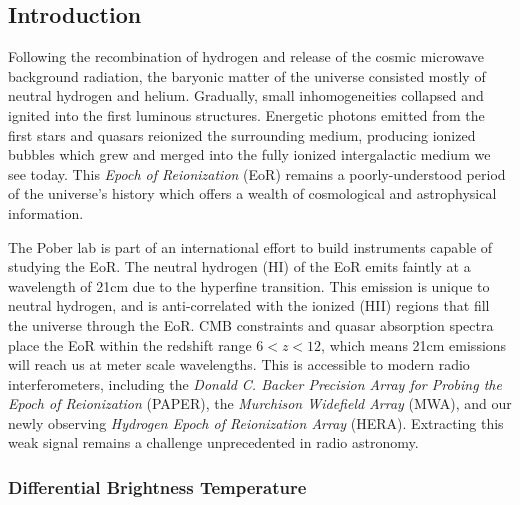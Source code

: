 \documentclass[a0,landscape]{a0poster}
\begin{document}
\begin{multicols}{4}

\color{DarkSlateGray}  %

\subsection*{Introduction}
Following the recombination of hydrogen and release of the cosmic microwave background radiation, the baryonic matter of the universe consisted mostly of neutral hydrogen and helium. Gradually, small inhomogeneities collapsed and ignited into the first luminous structures. Energetic photons emitted from the first stars and quasars reionized the surrounding medium, producing ionized bubbles which grew and merged into the fully ionized intergalactic medium we see today. This \emph{Epoch of Reionization} (EoR) remains a poorly-understood period of the universe's history which offers a wealth of cosmological and astrophysical information.

The Pober lab is part of an international effort to build instruments capable of studying the EoR. The neutral hydrogen (HI) of the EoR emits faintly at a wavelength of 21cm due to the hyperfine transition. This emission is unique to neutral hydrogen, and is anti-correlated with the ionized (HII) regions that fill the universe through the EoR. CMB constraints and quasar absorption spectra place the EoR within the redshift range $6 < z < 12$, which means 21cm emissions will reach us at meter scale wavelengths. This is accessible to modern radio interferometers, including the \emph{Donald C. Backer Precision Array for Probing the Epoch of Reionization} (PAPER), the \emph{Murchison Widefield Array} (MWA), and our newly observing \emph{Hydrogen Epoch of Reionization Array} (HERA). Extracting this weak signal remains a challenge unprecedented in radio astronomy.

\subsubsection*{Differential Brightness Temperature}


\end{multicols}
\end{document}
